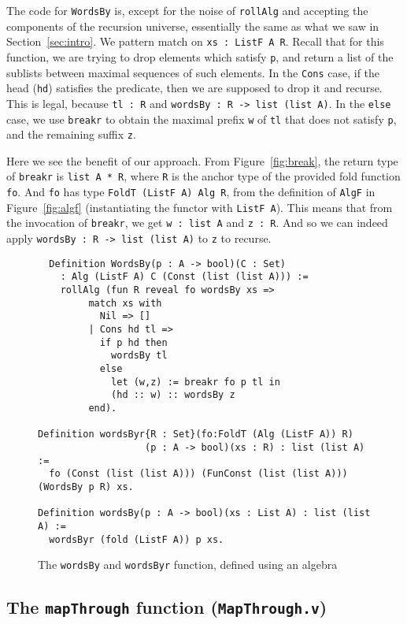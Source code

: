 \documentclass[a4paper,USenglish]{lipics-v2021}
\begin{document}
The code for \verb|WordsBy| is, except for the noise of \verb|rollAlg|
and accepting the components of the recursion universe, essentially
the same as what we saw in Section~\ref{sec:intro}.  We pattern match
on \verb|xs : ListF A R|.  Recall that for this function, we are
trying to drop elements which satisfy \verb|p|, and return a list of
the sublists between maximal sequences of such elements.  In the
\verb|Cons| case, if the head (\verb|hd|) satisfies the predicate, then we are
supposed to drop it and recurse.  This is legal, because \verb|tl : R|
and \verb|wordsBy : R -> list (list A)|.  In the \verb|else| case,
we use \verb|breakr| to obtain the maximal prefix \verb|w| of \verb|tl| that
does not satisfy \verb|p|, and the remaining suffix \verb|z|.

Here we see the benefit of our approach.  From Figure~\ref{fig:break},
the return type of \verb|breakr| is \verb|list A * R|, where \verb|R|
is the anchor type of the provided fold function \verb|fo|.  And
\verb|fo| has type \verb|FoldT (ListF A) Alg R|, from the definition
of \verb|AlgF| in Figure~\ref{fig:algf} (instantiating the functor
with \verb|ListF A|).  This means that from the invocation of
\verb|breakr|, we get \verb|w : list A| and \verb|z : R|.  And so we
can indeed apply \verb|wordsBy : R -> list (list A)| to
\verb|z| to recurse.

\begin{figure}
\begin{verbatim}
  Definition WordsBy(p : A -> bool)(C : Set)
    : Alg (ListF A) C (Const (list (list A))) :=
    rollAlg (fun R reveal fo wordsBy xs => 
         match xs with
           Nil => [] 
         | Cons hd tl =>
           if p hd then
             wordsBy tl
           else
             let (w,z) := breakr fo p tl in
             (hd :: w) :: wordsBy z
         end).

Definition wordsByr{R : Set}(fo:FoldT (Alg (ListF A)) R)
                   (p : A -> bool)(xs : R) : list (list A) :=
  fo (Const (list (list A))) (FunConst (list (list A))) (WordsBy p R) xs.

Definition wordsBy(p : A -> bool)(xs : List A) : list (list A) :=
  wordsByr (fold (ListF A)) p xs.
\end{verbatim}
\caption{The \texttt{wordsBy} and \texttt{wordsByr} function, defined using an algebra}
\label{fig:wordsby}
\end{figure}

\subsection{The \texttt{mapThrough} function (\texttt{MapThrough.v})}
\end{document}
